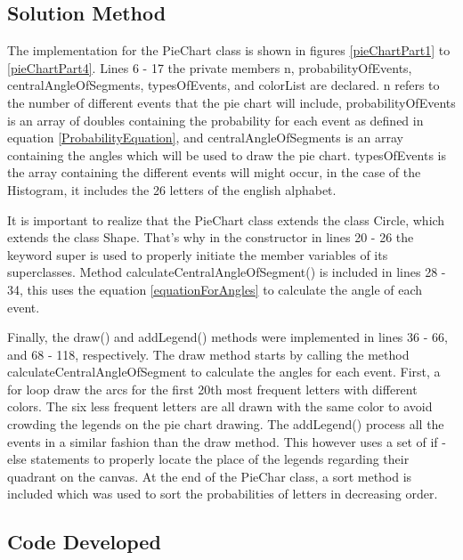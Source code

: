 \documentclass[a4paper,12pt]{article}
\begin{document}
\subsection{Solution Method}

The implementation for the PieChart class is shown in figures \ref{pieChartPart1} to \ref{pieChartPart4}. Lines 6 - 17 the private members n, probabilityOfEvents, centralAngleOfSegments, typesOfEvents, and colorList are declared. n refers to the number of different events that the pie chart will include,  probabilityOfEvents is an array of doubles containing the probability for each event as defined in equation \ref{ProbabilityEquation}, and centralAngleOfSegments is an array containing the angles which will be used to draw the pie chart. typesOfEvents is the array containing the different events will might occur, in the case of the Histogram, it includes the 26 letters of the english alphabet.  \newline

\vspace{0.25cm}
It is important to realize that the PieChart class extends the class Circle, which extends the class Shape. That's why in the constructor in lines 20 - 26 the keyword super is used to properly initiate the member variables of its superclasses. Method calculateCentralAngleOfSegment() is included in lines 28 - 34, this uses the equation \ref{equationForAngles} to calculate the angle of each event.  \newline

\vspace{0.25cm}
Finally, the draw() and addLegend() methods were implemented in lines 36 - 66, and 68 - 118, respectively. 
The draw method starts by calling the method calculateCentralAngleOfSegment  to calculate the angles for each event. First, a for loop draw the arcs for the first 20th most frequent letters with different colors. The six less frequent letters are all drawn with the same color to avoid crowding the legends on the pie chart drawing. The addLegend() process all the events in a similar fashion than the draw method. This however uses a set of if - else statements to properly locate the place of the legends regarding their quadrant on the canvas. At the end of the PieChar class, a sort method is included which was used to sort the probabilities of letters in decreasing order.

\subsection{Code Developed}
\end{document}
